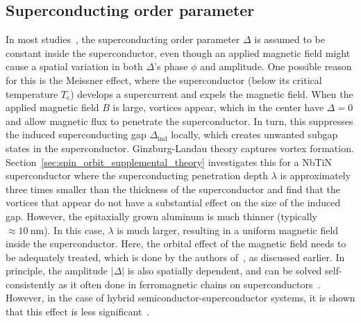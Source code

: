 \subsection{Superconducting order parameter}
In most studies~\cite{Antipov2018,Winkler2019,Vuik2016,Nijholt2016,Winkler2017}, the superconducting order parameter $\Delta$ is assumed to be constant inside the superconductor, even though an applied magnetic field might cause a spatial variation in both $\Delta$'s phase $\phi$ and amplitude.
One possible reason for this is the Meissner effect, where the superconductor (below its critical temperature $T_\textrm{c}$) develops a supercurrent and expels the magnetic field.
When the applied magnetic field $B$ is large, vortices appear, which in the center have $\Delta=0$ and allow magnetic flux to penetrate the superconductor.
In turn, this suppresses the induced superconducting gap $\Delta_\textrm{ind}$ locally, which creates unwanted subgap states in the superconductor.
Ginzburg-Landau theory captures vortex formation.
Section~\ref{sec:spin_orbit_supplemental_theory} investigates this for a NbTiN superconductor where the superconducting penetration depth $\lambda$ is approximately three times smaller than the thickness of the superconductor and find that the vortices that appear do not have a substantial effect on the size of the induced gap.
However, the epitaxially grown aluminum is much thinner (typically $\approx \SI{10}{\nm}$).
In this case, $\lambda$ is much larger, resulting in a uniform magnetic field inside the superconductor.
Here, the orbital effect of the magnetic field needs to be adequately treated, which is done by the authors of~\cite{Winkler2019,Wojcik2018}, as discussed earlier.
In principle, the amplitude $\left| \Delta \right|$ is also spatially dependent, and can be solved self-consistently as it often done in ferromagnetic chains on superconductors~\cite{Awoga2017,Sacramento2007}.
However, in the case of hybrid semiconductor-superconductor systems, it is shown that this effect is less significant~\cite{Awoga2019}.

